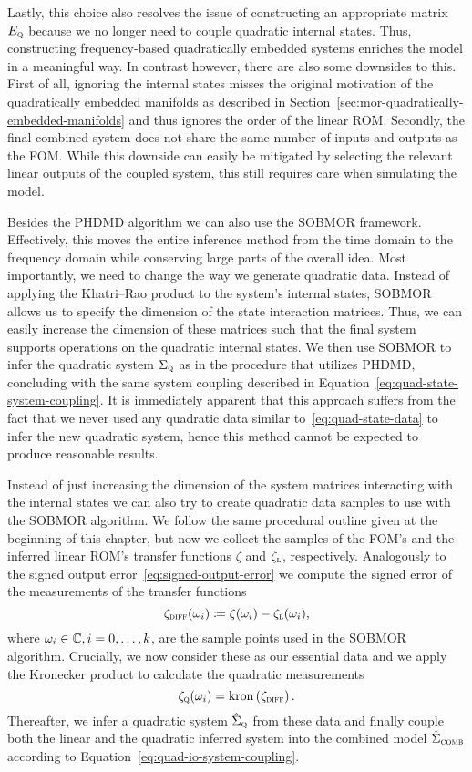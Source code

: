 Lastly, this choice also resolves the issue of constructing an appropriate matrix $E_{\textnormal{\scshape q}}$ because we no longer need to couple quadratic internal states.
Thus, constructing frequency-based quadratically embedded systems enriches the model in a meaningful way.
In contrast however, there are also some downsides to this.
First of all, ignoring the internal states misses the original motivation of the quadratically embedded manifolds as described in Section~\ref{sec:mor-quadratically-embedded-manifolds} and thus ignores the order of the linear \ac{ROM}.
Secondly, the final combined system does not share the same number of inputs and outputs as the \ac{FOM}.
While this downside can easily be mitigated by selecting the relevant linear outputs of the coupled system, this still requires care when simulating the model.

Besides the \ac{PHDMD} algorithm we can also use the \ac{SOBMOR} framework.
Effectively, this moves the entire inference method from the time domain to the frequency domain while conserving large parts of the overall idea.
Most importantly, we need to change the way we generate quadratic data.
Instead of applying the Khatri--Rao product to the system's internal states, \ac{SOBMOR} allows us to specify the dimension of the state interaction matrices.
Thus, we can easily increase the dimension of these matrices such that the final system supports operations on the quadratic internal states.
We then use \ac{SOBMOR} to infer the quadratic system $\Sigma_{\textnormal{\scshape q}}$ as in the procedure that utilizes \ac{PHDMD}, concluding with the same system coupling described in Equation~\eqref{eq:quad-state-system-coupling}.
It is immediately apparent that this approach suffers from the fact that we never used any quadratic data similar to~\eqref{eq:quad-state-data} to infer the new quadratic system, hence this method cannot be expected to produce reasonable results.

Instead of just increasing the dimension of the system matrices interacting with the internal states we can also try to create quadratic data samples to use with the \ac{SOBMOR} algorithm.
We follow the same procedural outline given at the beginning of this chapter, but now we collect the samples of the \ac{FOM}'s and the inferred linear \ac{ROM}'s transfer functions $\zeta$ and $\zeta_{\textnormal{\scshape l}}$, respectively.
Analogously to the signed output error~\eqref{eq:signed-output-error} we compute the signed error of the  measurements of the transfer functions
\begin{equation*}
    \zeta_{\textnormal{\scshape diff}}(\omega_i) \coloneqq \zeta(\omega_i) - \zeta_{\textnormal{\scshape l}}(\omega_i),
\end{equation*}
where $\omega_i \in \mathbb{C}, i = 0, \dots, k$, are the sample points used in the \ac{SOBMOR} algorithm.
Crucially, we now consider these as our essential data and we apply the Kronecker product to calculate the quadratic measurements
\begin{equation*}
    \zeta_{\textnormal{\scshape q}}(\omega_i) = \mathop{}\!\mathrm{kron}\left(\zeta_{\textnormal{\scshape diff}}\right).
\end{equation*}
Thereafter, we infer a quadratic system $\hat{\Sigma}_{\textnormal{\scshape q}}$ from these data and finally couple both the linear and the quadratic inferred system into the combined model $\hat{\Sigma}_{\textnormal{\scshape comb}}$ according to Equation~\eqref{eq:quad-io-system-coupling}.
